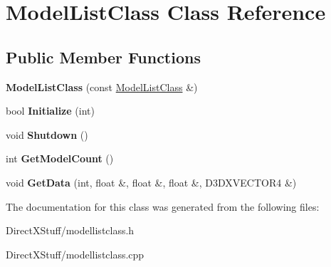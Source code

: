 \hypertarget{class_model_list_class}{\section{Model\-List\-Class Class Reference}
\label{class_model_list_class}
}
\subsection*{Public Member Functions}
\begin{DoxyCompactItemize}
\item 
\hypertarget{class_model_list_class_abb41d82c8c9b1b3f3bff8ba1c49cd354}{{\bfseries Model\-List\-Class} (const \hyperlink{class_model_list_class}{Model\-List\-Class} \&)}\label{class_model_list_class_abb41d82c8c9b1b3f3bff8ba1c49cd354}

\item 
\hypertarget{class_model_list_class_a0f9c5b735994d62ea7922461cadc2f4e}{bool {\bfseries Initialize} (int)}\label{class_model_list_class_a0f9c5b735994d62ea7922461cadc2f4e}

\item 
\hypertarget{class_model_list_class_a66c1618fb5701843e0b422af4b5178a8}{void {\bfseries Shutdown} ()}\label{class_model_list_class_a66c1618fb5701843e0b422af4b5178a8}

\item 
\hypertarget{class_model_list_class_a5192c3a769afe0a1900b791176745859}{int {\bfseries Get\-Model\-Count} ()}\label{class_model_list_class_a5192c3a769afe0a1900b791176745859}

\item 
\hypertarget{class_model_list_class_a0acf8bf693653f43c5aa98fd68c58ef7}{void {\bfseries Get\-Data} (int, float \&, float \&, float \&, D3\-D\-X\-V\-E\-C\-T\-O\-R4 \&)}\label{class_model_list_class_a0acf8bf693653f43c5aa98fd68c58ef7}

\end{DoxyCompactItemize}


The documentation for this class was generated from the following files\-:\begin{DoxyCompactItemize}
\item 
Direct\-X\-Stuff/modellistclass.\-h\item 
Direct\-X\-Stuff/modellistclass.\-cpp\end{DoxyCompactItemize}
